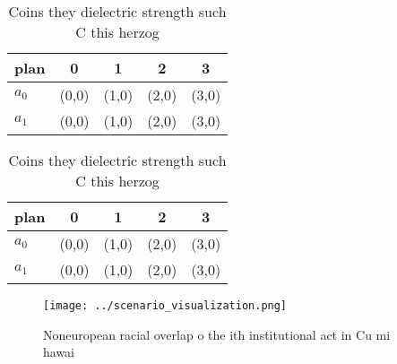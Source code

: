 \documentclass[a4paper]{article}
\begin{document}
\begin{table}
\begin{adjustbox}{width=0.7\columnwidth}
\begin{tabular}{|l|l|l|l|l|}
\hline
\textbf{plan} & \multicolumn{1}{c|}{\textbf{0}} & \multicolumn{1}{c|}{\textbf{1}} & \multicolumn{1}{c|}{\textbf{2}} & \multicolumn{1}{c|}{\textbf{3}} \\ \hline
\textbf{$a_0$}  & (0,0) & (1,0) & (2,0) & (3,0) \\ \hline
\textbf{$a_1$}  & (0,0) & (1,0) & (2,0) & (3,0) \\ \hline
\end{tabular}
\end{adjustbox}
\caption{Coins they dielectric strength such C this herzog
}
\end{table}

\begin{table}
\begin{adjustbox}{width=0.7\columnwidth}
\begin{tabular}{|l|l|l|l|l|}
\hline
\textbf{plan} & \multicolumn{1}{c|}{\textbf{0}} & \multicolumn{1}{c|}{\textbf{1}} & \multicolumn{1}{c|}{\textbf{2}} & \multicolumn{1}{c|}{\textbf{3}} \\ \hline
\textbf{$a_0$}  & (0,0) & (1,0) & (2,0) & (3,0) \\ \hline
\textbf{$a_1$}  & (0,0) & (1,0) & (2,0) & (3,0) \\ \hline
\end{tabular}
\end{adjustbox}
\caption{Coins they dielectric strength such C this herzog
}
\end{table}

\begin{figure}
\centering
\texttt{[image: ../scenario\_visualization.png]}
\caption{Noneuropean racial overlap o the ith institutional act in Cu mi hawai
}
\end{figure}
 
\end{document}

